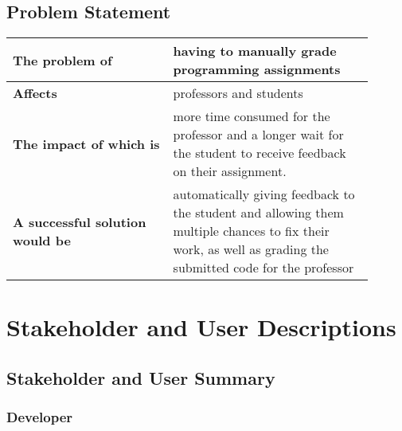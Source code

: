 \documentclass{article}
\begin{document}
\subsection{Problem Statement}

\begin{center}
  \begin{tabular}{| p{0.4\linewidth} | p{0.5\linewidth} | }
    \hline
    \textbf{The problem of} & having to manually grade programming assignments\\
    \hline
    \textbf{Affects} & professors and students\\
    \hline
    \textbf{The impact of which is} & more time consumed for the professor and a longer wait for the student to receive feedback on their assignment.\\
    \hline
    \textbf{A successful solution would be} & automatically giving feedback to the student and allowing them multiple chances to fix their work, as well as grading the submitted code for the professor \\
    \hline
  \end{tabular}
\end{center}



\section{Stakeholder and User Descriptions}

\subsection{Stakeholder and User Summary}

\subsubsection{Developer}
\end{document}
